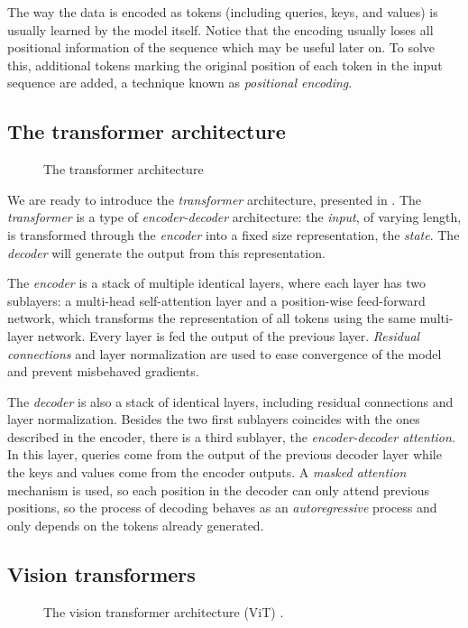 The way the data is encoded as tokens (including queries, keys, and values) is usually learned by the model itself. Notice that the encoding usually loses all positional information of the sequence which may be useful later on. To solve this, additional tokens marking the original position of each token in the input sequence are added, a technique known as \textit{positional encoding}.

\subsection{The transformer architecture}
\begin{figure}[tb]
    \centering
    
    \caption{The transformer architecture \cite{zhang2021dive}}
    \label{fig:transformer}
\end{figure}

We are ready to introduce the \textit{transformer} architecture, presented in . The \textit{transformer} is a type of \textit{encoder-decoder} architecture: the \textit{input}, of varying length, is transformed through the \textit{encoder} into a fixed size representation, the \textit{state}. The \textit{decoder} will generate the output from this representation.

The \textit{encoder} is a stack of multiple identical layers, where each layer has two sublayers: a multi-head self-attention layer and a position-wise feed-forward network, which transforms the representation of all tokens using the same multi-layer network. Every layer is fed the output of the previous layer. \textit{Residual connections} \cite{he2016deep} and layer normalization are used to ease convergence of the model and prevent misbehaved gradients. 

The \textit{decoder} is also a stack of identical layers, including residual connections and layer normalization. Besides the two first sublayers coincides with the ones described in the encoder, there is a third sublayer, the \textit{encoder-decoder attention}. In this layer, queries come from the output of the previous decoder layer while the keys and values come from the encoder outputs. A \textit{masked attention} mechanism is used, so each position in the decoder can only attend previous positions, so the process of decoding behaves as an \textit{autoregressive} process and only depends on the tokens already generated.

\subsection{Vision transformers} 
\begin{figure}[tb]
    \centering
    
    \caption{The vision transformer architecture (ViT) \cite{zhang2021dive}.}
    \label{fig:vit}
\end{figure}

